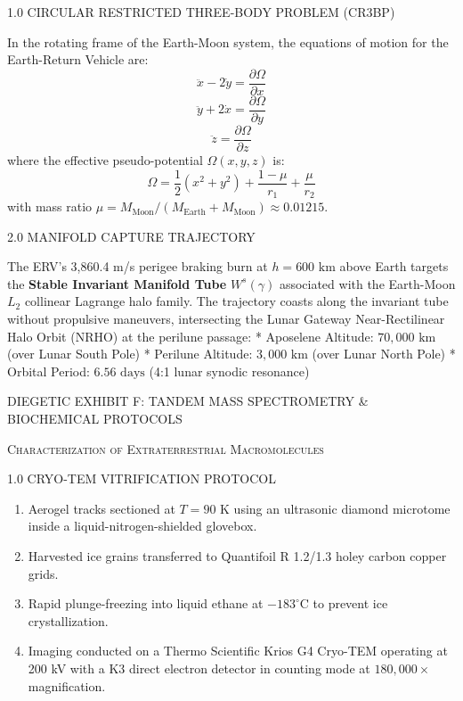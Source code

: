 \documentclass[12pt,twoside,openright]{book}
\newcommand{\sceneheader}[1]{%
  \par\vspace{1.8em}%
  {\noindent\centering\scshape\large #1\par}%
  \vspace{1.0em}%
  \noindent%
}
\newcommand{\dinkus}{%
  \par\vspace{1.2em}%
  {\noindent\centering{\large $\ast\quad\ast\quad\ast$}\par}%
  \vspace{1.2em}%
  \noindent%
}
\providecommand{\tightlist}{\setlength{\itemsep}{0pt}\setlength{\parskip}{0pt}
\setlength{\tabcolsep}{2pt}}
\begin{document}
\sceneheader{1.0 CIRCULAR RESTRICTED THREE-BODY PROBLEM
(CR3BP)}

In the rotating frame of the Earth-Moon system, the equations of motion
for the Earth-Return Vehicle are:
\[\ddot{x} - 2\dot{y} = \frac{\partial \Omega}{\partial x}\]
\[\ddot{y} + 2\dot{x} = \frac{\partial \Omega}{\partial y}\]
\[\ddot{z} = \frac{\partial \Omega}{\partial z}\] where the effective
pseudo-potential \(\Omega(x,y,z)\) is:
\[\Omega = \frac{1}{2}(x^2 + y^2) + \frac{1-\mu}{r_1} + \frac{\mu}{r_2}\]
with mass ratio
\(\mu = M_{\text{Moon}} / (M_{\text{Earth}} + M_{\text{Moon}}) \approx 0.01215\).

\sceneheader{2.0 MANIFOLD CAPTURE
TRAJECTORY}

The ERV's 3,860.4 m/s perigee braking burn at \(h = 600\text{ km}\)
above Earth targets the \textbf{Stable Invariant Manifold Tube}
\(W^s(\gamma)\) associated with the Earth-Moon \(L_2\) collinear
Lagrange halo family. The trajectory coasts along the invariant tube
without propulsive maneuvers, intersecting the Lunar Gateway
Near-Rectilinear Halo Orbit (NRHO) at the perilune passage: * Aposelene
Altitude: \(70,000 \text{ km}\) (over Lunar South Pole) * Perilune
Altitude: \(3,000 \text{ km}\) (over Lunar North Pole) * Orbital Period:
\(6.56 \text{ days}\) (4:1 lunar synodic resonance)

\dinkus

\sceneheader{DIEGETIC EXHIBIT F: TANDEM MASS SPECTROMETRY \& BIOCHEMICAL
PROTOCOLS}

\sceneheader{Characterization of Extraterrestrial
Macromolecules}

\sceneheader{1.0 CRYO-TEM VITRIFICATION
PROTOCOL}

\begin{enumerate}
\def\labelenumi{\arabic{enumi}.}
\tightlist
\item
  Aerogel tracks sectioned at \(T = 90\text{ K}\) using an ultrasonic
  diamond microtome inside a liquid-nitrogen-shielded glovebox.
\item
  Harvested ice grains transferred to Quantifoil R 1.2/1.3 holey carbon
  copper grids.
\item
  Rapid plunge-freezing into liquid ethane at \(-183^\circ\text{C}\) to
  prevent ice crystallization.
\item
  Imaging conducted on a Thermo Scientific Krios G4 Cryo-TEM operating
  at 200 kV with a K3 direct electron detector in counting mode at
  \(180,000\times\) magnification.
\end{enumerate}
\end{document}
